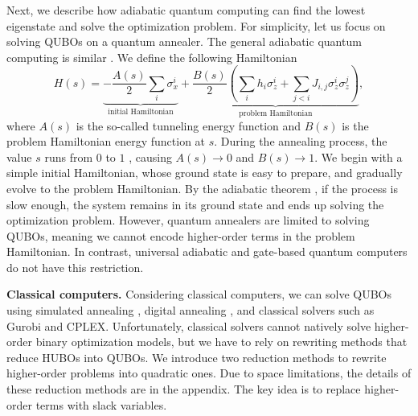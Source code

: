 Next, we describe how adiabatic quantum computing can find the lowest eigenstate and solve the optimization problem. For simplicity, let us focus on solving QUBOs on a quantum annealer. The general adiabatic quantum computing is similar \cite{Lidar_adiabatic}. We define the following Hamiltonian \cite{d_wave}
\begin{equation}\label{eq:adiabatic_Hamiltonian}
H(s) = \underbrace{-\frac{A(s)}{2}\sum_{i} \sigma_{x}^{i}}_{\text{initial Hamiltonian}} + \underbrace{\frac{B(s)}{2}\left( \sum_{i} h_i \sigma_{z}^{i} + \sum_{j < i} J_{i,j}\sigma_{z}^{i}\sigma_{z}^{j}\right)}_{\text{problem Hamiltonian}},
\end{equation}
where $A(s)$ is the so-called tunneling energy function and $B(s)$ is the problem Hamiltonian energy function at $s$. During the annealing process, the value $s$ runs from $0$ to $1$ , causing $A(s) \to 0$ and $B(s) \to 1$. We begin with a simple initial Hamiltonian, whose ground state is easy to prepare, and gradually evolve to the problem Hamiltonian. By the adiabatic theorem \cite{Lidar_adiabatic}, if the process is slow enough, the system remains in its ground state and ends up solving the optimization problem. However, quantum annealers are limited to solving QUBOs, meaning we cannot encode higher-order terms in the problem Hamiltonian. In contrast, universal adiabatic and gate-based quantum computers do not have this restriction.

\textbf{Classical computers.} Considering classical computers, we can solve QUBOs using simulated annealing \cite{doi:10.1126/science.220.4598.671}, digital annealing \cite{Aramon_Rosenberg_Valiante_Miyazawa_Tamura_Katzgraber_2019}, and classical solvers such as Gurobi and CPLEX. Unfortunately, classical solvers cannot natively solve higher-order binary optimization models, but we have to rely on rewriting methods that reduce HUBOs into QUBOs. We introduce two reduction methods to rewrite higher-order problems into quadratic ones. Due to space limitations, the details of these reduction methods are in the appendix. The key idea is to replace higher-order terms with slack variables.